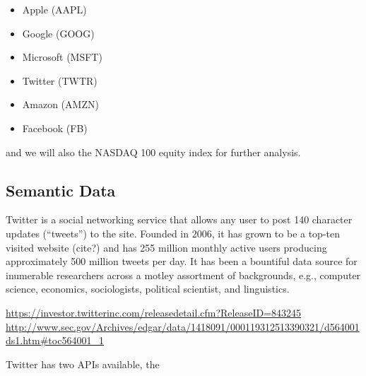 \documentclass[titlepage]{article}\usepackage[]{graphicx}\usepackage[]{color}
\begin{document}
\begin{itemize}
	\item Apple (AAPL)
	\item Google (GOOG)
	\item Microsoft (MSFT)
	\item Twitter (TWTR)
	\item Amazon (AMZN)
	\item Facebook (FB)
\end{itemize}

and we will also the NASDAQ 100 equity index for further analysis.


\subsection{Semantic Data}
Twitter is a social networking service that allows any user to post 140
character updates (``tweets'') to the site. Founded in 2006, it has grown to be
a top-ten visited website (cite?) and has 255 million monthly active users
producing approximately 500 million tweets per day. It has been a bountiful
data source for inumerable researchers across a motley assortment of
backgrounds, e.g., computer science, economics, sociologists, political
scientist, and linguistics.

\url{https://investor.twitterinc.com/releasedetail.cfm?ReleaseID=843245}
\url{http://www.sec.gov/Archives/edgar/data/1418091/000119312513390321/d564001ds1.htm#toc564001_1}

Twitter has two APIs available, the 
\end{document}
